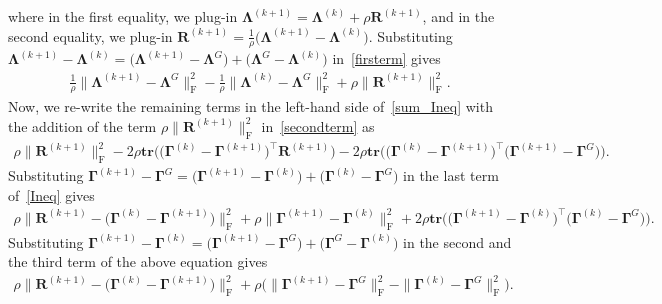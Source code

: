 \documentclass[alpha-refs]{wiley-article}
\begin{document}
where in the first equality, we plug-in $\boldsymbol{\Lambda}^{(k+1)}=\boldsymbol{\Lambda}^{(k)}+\rho \boldsymbol{R}^{(k+1)}$, and in the second equality, we plug-in $\boldsymbol{R}^{(k+1)}=\frac{1}{\rho}\big( \boldsymbol{\Lambda}^{(k+1)} - \boldsymbol{\Lambda}^{(k)} \big)$.
Substituting $\boldsymbol{\Lambda}^{(k+1)} - \boldsymbol{\Lambda}^{(k)} = \big( \boldsymbol{\Lambda}^{(k+1)} - \boldsymbol{\Lambda}^{G} \big) + \big( \boldsymbol{\Lambda}^{G} - \boldsymbol{\Lambda}^{(k)} \big)$ in~\eqref{firsterm} gives
\begin{align}
    \frac{1}{\rho} \| \boldsymbol{\Lambda}^{(k+1)} - \boldsymbol{\Lambda}^{G} \|_{\text{F}}^{2} - \frac{1}{\rho} \| \boldsymbol{\Lambda}^{(k)} - \boldsymbol{\Lambda}^{G} \|_{\text{F}}^{2} + \rho \| \boldsymbol{R}^{(k+1)} \|_{\text{F}}^{2}. \label{secondterm}
\end{align}
Now, we re-write the remaining terms in the left-hand side of~\eqref{sum_Ineq} with the addition of the term $\rho \| \boldsymbol{R}^{(k+1)} \|_{\text{F}}^{2}$ in~\eqref{secondterm} as
\begin{align} \label{Ineq}
    \rho \| \boldsymbol{R}^{(k+1)} \|_{\text{F}}^{2} -2 \rho \textbf{tr}\big( \big( \boldsymbol{\Gamma}^{(k)} - \boldsymbol{\Gamma}^{(k+1)} \big)^{\top}\boldsymbol{R}^{(k+1)} \big)
    -2\rho \textbf{tr}\big( \big( \boldsymbol{\Gamma}^{(k)} - \boldsymbol{\Gamma}^{(k+1)} \big)^{\top}\big(\boldsymbol{\Gamma}^{(k+1)}-\boldsymbol{\Gamma}^{G}\big) \big).
\end{align}
Substituting $\boldsymbol{\Gamma}^{(k+1)} - \boldsymbol{\Gamma}^{G} = \big( \boldsymbol{\Gamma}^{(k+1)} - \boldsymbol{\Gamma}^{(k)} \big) + \big( \boldsymbol{\Gamma}^{(k)} - \boldsymbol{\Gamma}^{G} \big)$ in the last term of~\eqref{Ineq} gives
\begin{align*}
    \rho \| \boldsymbol{R}^{(k+1)} - \big( \boldsymbol{\Gamma}^{(k)} - \boldsymbol{\Gamma}^{(k+1)} \big) \|_{\text{F}}^{2}
    + \rho \| \boldsymbol{\Gamma}^{(k+1)} - \boldsymbol{\Gamma}^{(k)} \|_{\text{F}}^{2} + 2 \rho \textbf{tr}\big( \big( \boldsymbol{\Gamma}^{(k+1)} - \boldsymbol{\Gamma}^{(k)} \big)^{\top}\big(\boldsymbol{\Gamma}^{(k)}-\boldsymbol{\Gamma}^{G}\big) \big).
\end{align*}
Substituting $\boldsymbol{\Gamma}^{(k+1)} - \boldsymbol{\Gamma}^{(k)} = \big( \boldsymbol{\Gamma}^{(k+1)} - \boldsymbol{\Gamma}^{G} \big) + \big( \boldsymbol{\Gamma}^{G} - \boldsymbol{\Gamma}^{(k)} \big)$ in the second and the third term of the above equation gives
\begin{align*}
    \rho \| \boldsymbol{R}^{(k+1)} - \big( \boldsymbol{\Gamma}^{(k)} - \boldsymbol{\Gamma}^{(k+1)} \big) \|_{\text{F}}^{2}
    + \rho \bigg( \| \boldsymbol{\Gamma}^{(k+1)} - \boldsymbol{\Gamma}^{G} \|_{\text{F}}^{2}
    - \| \boldsymbol{\Gamma}^{(k)} - \boldsymbol{\Gamma}^{G} \|_{\text{F}}^{2} \bigg).
\end{align*}
\end{document}

